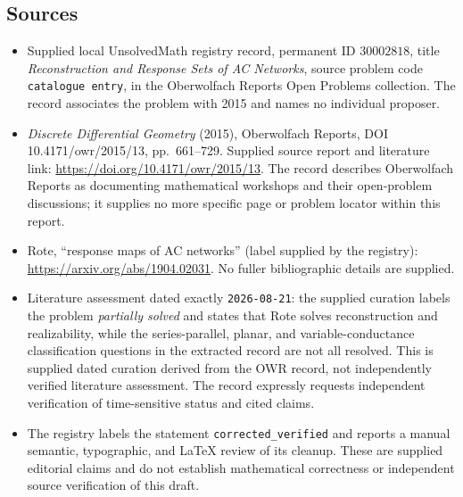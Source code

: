 \documentclass[11pt]{article}
\begin{document}
\subsection{Sources}
\begin{itemize}
\item Supplied local UnsolvedMath registry record, permanent ID \(30002818\), title \emph{Reconstruction and Response Sets of AC Networks}, source problem code \texttt{catalogue entry}, in the Oberwolfach Reports Open Problems collection. The record associates the problem with 2015 and names no individual proposer.
\item \emph{Discrete Differential Geometry} (2015), Oberwolfach Reports, DOI 10.4171/owr/2015/13, pp.~661--729. Supplied source report and literature link: \url{https://doi.org/10.4171/owr/2015/13}. The record describes Oberwolfach Reports as documenting mathematical workshops and their open-problem discussions; it supplies no more specific page or problem locator within this report.
\item Rote, ``response maps of AC networks'' (label supplied by the registry): \url{https://arxiv.org/abs/1904.02031}. No fuller bibliographic details are supplied.
\item Literature assessment dated exactly \texttt{2026-08-21}: the supplied curation labels the problem \emph{partially solved} and states that Rote solves reconstruction and realizability, while the series-parallel, planar, and variable-conductance classification questions in the extracted record are not all resolved. This is supplied dated curation derived from the OWR record, not independently verified literature assessment. The record expressly requests independent verification of time-sensitive status and cited claims.
\item The registry labels the statement \texttt{corrected\_verified} and reports a manual semantic, typographic, and LaTeX review of its cleanup. These are supplied editorial claims and do not establish mathematical correctness or independent source verification of this draft.
\end{itemize}
\end{document}
